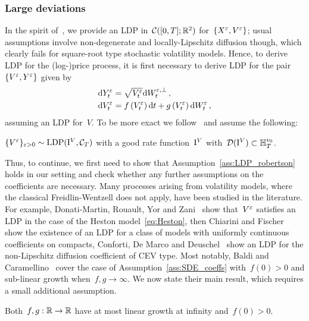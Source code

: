 \subsubsection{Large deviations}
In the spirit of~\cite{Freidlin2012RandomSystems}, 
we provide an LDP in~${\mathcal{C}([0,T];\mathbb{R}^2)}$ for~$\{X^\varepsilon, V^\varepsilon\}$;
usual assumptions involve non-degenerate and locally-Lipschitz diffusion though, 
which clearly fails for square-root type stochastic volatility models. Hence, to derive LDP for the (log-)price process, it is first necessary to derive LDP for the pair~$\{V^\varepsilon, Y^\varepsilon\}$ given by
\begin{align*}
\mathrm{d} Y^\varepsilon_{t} &= \sqrt{V^\varepsilon_{t}} \mathrm{d} W^{\varepsilon,\perp}_{t}\,, \\
\mathrm{d} V^\varepsilon_{t} &= f\left(V^\varepsilon_{t}\right) \mathrm{d} t + g\left(V^\varepsilon_{t}\right) \mathrm{d} W^\varepsilon_{t}\,,
\end{align*}
assuming an LDP for~$V$. 
To be more exact we follow~\cite{Robertson2010SampleModels} and assume the following:
\begin{assumption}\label{ass:LDP_robertson}
$\{V^{\varepsilon}\}_{\varepsilon>0}\sim\mathrm{LDP}(\mathrm{I}^{V}, \mathcal{C}_T)$
with a good rate function~$\mathrm{I}^{V}$ 
with~${\mathcal{D}(\mathrm{I}^{V})\subset\mathbb{H}_{T}^{v_0}}$.
\end{assumption}
Thus, to continue, we first need to show that Assumption~\ref{ass:LDP_robertson} holds in our setting and check whether any further assumptions on the coefficients are necessary. 
Many processes arising from volatility models, where the classical Freidlin-Wentzell does not apply, have been studied in the literature. 
For example, Donati-Martin, Rouault, Yor and Zani~\cite{Donati-Martin2004LargeProcesses} show that~$V^{\varepsilon}$ satisfies an LDP in the case of the Heston model~\eqref{eq:Heston}, then Chiarini and Fischer~\cite{Chiarini2014OnProcesses} show the existence of an LDP for a class of models with uniformly continuous coefficients on compacts, 
Conforti, De Marco and Deuschel~\cite{Conforti2015OnModels} 
show an LDP for the non-Lipschitz diffusion coefficient of CEV type. 
Most notably, Baldi and Caramellino~\cite{Baldi2011GeneralDiffusions} cover the case of Assumption~\ref{ass:SDE_coeffs} with~$f(0)>0$ and sub-linear growth when~$f,g\to\infty$. We now state their main result, which requires a small additional assumption.
\begin{assumption}\label{ass:Baldi}
Both~$f,g:\mathbb{R}\to\mathbb{R}$ have at most linear growth at infinity and~$f(0)>0$.
\end{assumption}
